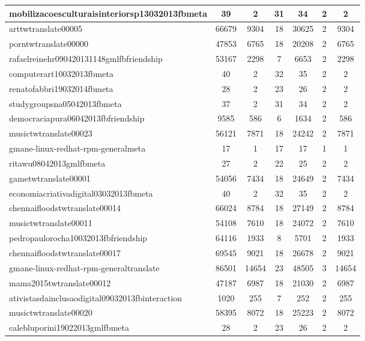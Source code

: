 \begin{table*}[h!]
\begin{center}
\begin{tabular}{| l | c | c | c | c | c | c |}
mobilizacoesculturaisinteriorsp13032013fbmeta & 39  & 2  & 31  & 34  & 2  & 2 \\\hline
arttwtranslate00005 & 66679  & 9304  & 18  & 30625  & 2  & 9304 \\\hline
porntwtranslate00000 & 47853  & 6765  & 18  & 20208  & 2  & 6765 \\\hline
rafaelreinehr090420131148gmlfbfriendship & 53167  & 2298  & 7  & 6653  & 2  & 2298 \\\hline
computerart10032013fbmeta & 40  & 2  & 32  & 35  & 2  & 2 \\\hline
renatofabbri19032014fbmeta & 28  & 2  & 23  & 26  & 2  & 2 \\\hline
studygroupsna05042013fbmeta & 37  & 2  & 31  & 34  & 2  & 2 \\\hline
democraciapura06042013fbfriendship & 9585  & 586  & 6  & 1634  & 2  & 586 \\\hline
musictwtranslate00023 & 56121  & 7871  & 18  & 24242  & 2  & 7871 \\\hline
gmane-linux-redhat-rpm-generalmeta & 17  & 1  & 17  & 17  & 1  & 1 \\\hline
ritawu08042013gmlfbmeta & 27  & 2  & 22  & 25  & 2  & 2 \\\hline
gametwtranslate00001 & 54056  & 7434  & 18  & 24649  & 2  & 7434 \\\hline
economiacriativadigital03032013fbmeta & 40  & 2  & 32  & 35  & 2  & 2 \\\hline
chennaifloodstwtranslate00014 & 66024  & 8784  & 18  & 27149  & 2  & 8784 \\\hline
musictwtranslate00011 & 54108  & 7610  & 18  & 24072  & 2  & 7610 \\\hline
pedropaulorocha10032013fbfriendship & 64116  & 1933  & 8  & 5701  & 2  & 1933 \\\hline
chennaifloodstwtranslate00017 & 69545  & 9021  & 18  & 26678  & 2  & 9021 \\\hline
gmane-linux-redhat-rpm-generaltranslate & 86501  & 14654  & 23  & 48505  & 3  & 14654 \\\hline
mama2015twtranslate00012 & 47187  & 6987  & 18  & 21030  & 2  & 6987 \\\hline
ativistasdainclusaodigital09032013fbinteraction & 1020  & 255  & 7  & 252  & 2  & 255 \\\hline
musictwtranslate00020 & 58395  & 8072  & 18  & 25223  & 2  & 8072 \\\hline
calebluporini19022013gmlfbmeta & 28  & 2  & 23  & 26  & 2  & 2 \\\hline

\end{tabular}
\end{center}
\end{table*}
